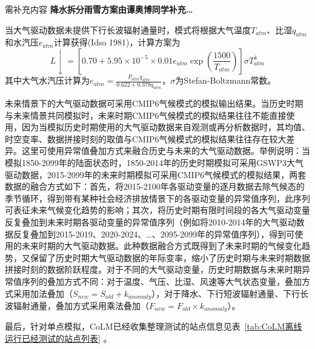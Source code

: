 \begin{mymdframed}{需补充内容}
\textbf{\color{red}降水拆分雨雪方案由谭奥博同学补充…}
\end{mymdframed}

当大气驱动数据未提供下行长波辐射通量时，模式将根据大气温度$T_{atm}$、比湿$q_{atm}$和水汽压$e_{atm}$计算获得(Idso 1981)，计算方案为
\begin{equation}\label{L_downarrow}
L \downarrow=\left[0.70+5.95 \times 10^{-5} \times 0.01 e_{a t m} \exp \left(\frac{1500}{T_{a t m}}\right)\right] \sigma T_{a t m}^{4}
\end{equation}
其中大气水汽压计算为$e_{a t m}=\frac{P_{a t m} q_{a t m}}{0.622+0.378 q_{a t m}}$，$\sigma$为Stefan-Boltzmann常数。

未来情景下的大气驱动数据可采用CMIP6气候模式的模拟输出结果。当历史时期与未来情景共同模拟时，未来时期CMIP6气候模式的模拟结果往往不能直接使用，因为当模拟历史时期使用的大气驱动数据来自观测或再分析数据时，其均值、时空变率、数据拼接时刻的取值与CMIP6气候模式的模拟结果往往存在较大差异。这里可使用异常值叠加方式来融合历史与未来的大气驱动数据。举例说明：当模拟1850-2099年的陆面状态时，1850-2014年的历史时期模拟可采用GSWP3大气驱动数据，2015-2099年的未来时期模拟可采用CMIP6气候模式的模拟结果，两套数据的融合方式如下：首先，将2015-2100年各驱动变量的逐月数据去除气候态的季节循环，得到带有某种社会经济排放情景下的各驱动变量的异常值序列，此序列可表征未来气候变化趋势的影响；其次，将历史时期有限时间段的各大气驱动变量反复叠加到未来时期各驱动变量的异常值序列（例如将2010-2014年的大气驱动数据反复叠加到2015-2019、2020-2024、…、2095-2099年的异常值序列），得到可使用的未来时期的大气驱动数据。此种数据融合方式既得到了未来时期的气候变化趋势，又保留了历史时期大气驱动数据的年际变率，缩小了历史时期与未来时期数据拼接时刻的数据阶跃程度。对于不同的大气驱动变量，历史时期数据与未来时期异常值序列的叠加方式不同：对于温度、气压、比湿、风速等大气状态变量，叠加方式采用加法叠加（$S_{new}=S_{old}+k_{anomaly}$），对于降水、下行短波辐射通量、下行长波辐射通量，叠加方式采用乘法叠加（$F_{new}=F_{old}\times k_{anomaly}$）。


最后，针对单点模拟，CoLM已经收集整理测试的站点信息见表~\ref{tab:CoLM离线运行已经测试的站点列表} 。

